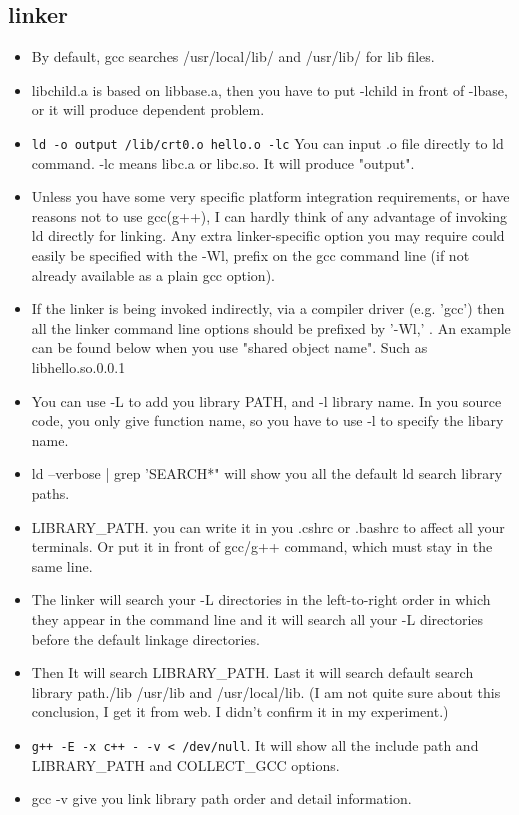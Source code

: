 \documentclass[a4paper,11pt,twoside]{book}
\begin{document}
\subsection{linker}
			 \begin{itemize}
			 \item By default, gcc searches /usr/local/lib/ and /usr/lib/ for lib files.
			 
			 \item libchild.a is based on libbase.a, then you have to put -lchild in front of -lbase, or it will produce dependent problem. 
			 
			\item \verb=ld -o output /lib/crt0.o hello.o -lc= You can input .o file directly to ld command. -lc means libc.a or libc.so. It will produce "output". 
					 
			\item Unless you have some very specific platform integration requirements, or have reasons not to use gcc(g++), I can hardly think of any advantage of invoking ld directly for linking. Any extra linker-specific option you may require could easily be specified with the -Wl, prefix on the gcc command line (if not already available as a plain gcc option).

			 \item If the linker is being invoked indirectly, via a compiler driver (e.g. 'gcc') then all the linker command line options should be prefixed by '-Wl,' . An example can be found below when you use "shared object name". Such as libhello.so.0.0.1

    \item You can use -L to add you library PATH, and -l library name. In you source code, you only give function name, so you have to use -l to specify the libary name. 

	\item ld --verbose | grep 'SEARCH*" will show you all the default ld search library paths.
			
   \item LIBRARY\_PATH. you can write it in you .cshrc or .bashrc to affect all your terminals. Or put it in front of gcc/g++ command, which must stay in the same line.        
	 
	\item The linker will search your -L directories in the left-to-right order in which they appear in the command line and it will search all your -L directories before the default linkage directories.
	
	\item Then It will search LIBRARY\_PATH. Last it will search default search library path./lib /usr/lib and /usr/local/lib. (I am not quite sure about this conclusion, I get it from web. I didn't confirm it in my experiment.)
	
	\item \verb=g++ -E -x c++ - -v < /dev/null=. It will show all the include path and LIBRARY\_PATH and COLLECT\_GCC options.

	\item gcc -v give you link library path order and detail information. 
	\end{itemize}
\end{document}
